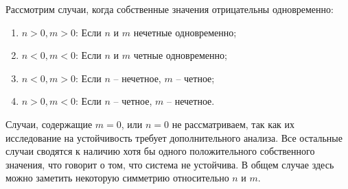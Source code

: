 		Рассмотрим случаи, когда собственные значения отрицательны одновременно:
		\begin{enumerate}
			\item $n > 0, m > 0$: Если $n$ и $m$ нечетные одновременно;
			\item $n < 0, m < 0$: Если $n$ и $m$ четные одновременно;
			\item $n < 0, m > 0$: Если $n$ -- нечетное, $m$ -- четное;
			\item $n > 0, m < 0$: Если $n$ -- четное, $m$ -- нечетное.
		\end{enumerate}
		Случаи, содержащие $m = 0$, или $n = 0$ не рассматриваем, так как их исследование на устойчивость требует дополнительного анализа. Все остальные случаи сводятся к наличию хотя бы одного положительного собственного значения, что говорит о том, что система не устойчива. В общем случае здесь можно заметить некоторую симметрию относительно $n$ и $m$.


